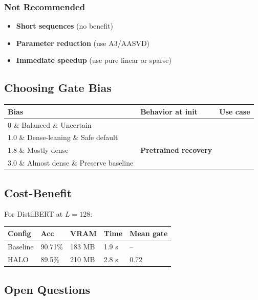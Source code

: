 \subsubsection{Not Recommended}

\begin{itemize}
\item \textbf{Short sequences} (no benefit)
\item \textbf{Parameter reduction} (use A3/AASVD)
\item \textbf{Immediate speedup} (use pure linear or sparse)

\end{itemize}
\subsection{Choosing Gate Bias}

\begin{table}[H]
\centering
\small
\begin{tabular}{lll}
\toprule
\textbf{Bias} & \textbf{Behavior at init} & \textbf{Use case} \\
\midrule
0 \& Balanced \& Uncertain \\
1.0 \& Dense-leaning \& Safe default \\
1.8 \& Mostly dense & \textbf{Pretrained recovery} \\
3.0 \& Almost dense \& Preserve baseline \\
\bottomrule
\end{tabular}
\end{table}

\subsection{Cost-Benefit}

For DistilBERT at $L = 128$:

\begin{table}[H]
\centering
\small
\begin{tabular}{lllll}
\toprule
\textbf{Config} & \textbf{Acc} & \textbf{VRAM} & \textbf{Time} & \textbf{Mean gate} \\
\midrule
Baseline & 90.71\% & 183 MB & 1.9 s & -- \\
HALO & 89.5\% & 210 MB & 2.8 s & 0.72 \\
\bottomrule
\end{tabular}
\end{table}

\subsection{Open Questions}

